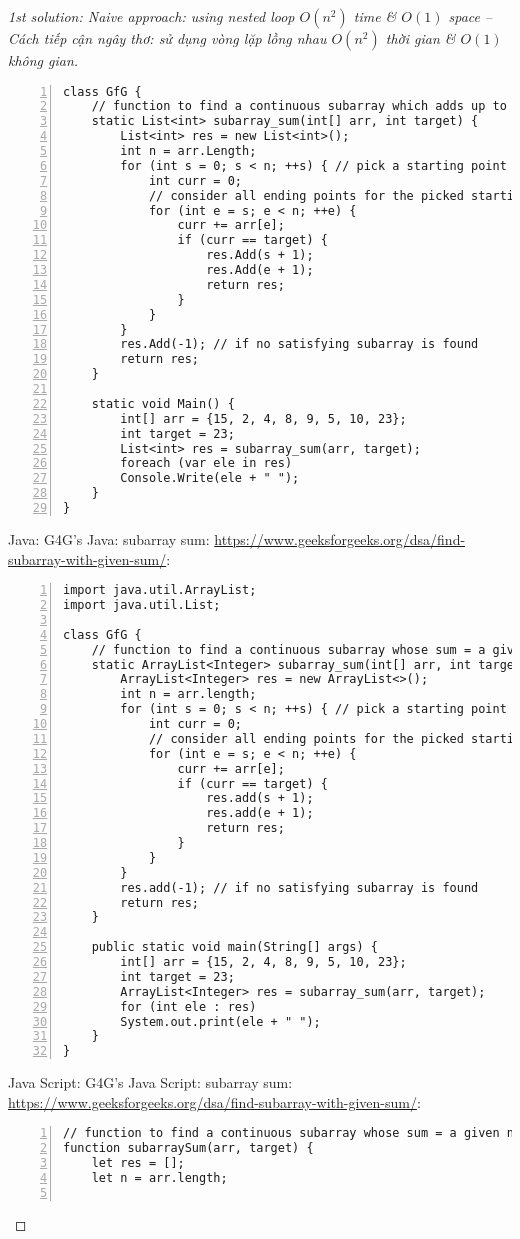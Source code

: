 \documentclass{article}
\begin{document}
\begin{proof}[1st solution: Naive approach: using nested loop $O(n^2)$ time \& $O(1)$ space -- Cách tiếp cận ngây thơ: sử dụng vòng lặp lồng nhau $O(n^2)$ thời gian \& $O(1)$ không gian]
\begin{Verbatim}[numbers=left,xleftmargin=5mm]
class GfG {
    // function to find a continuous subarray which adds up to a given number
    static List<int> subarray_sum(int[] arr, int target) {
        List<int> res = new List<int>();
        int n = arr.Length;
        for (int s = 0; s < n; ++s) { // pick a starting point for a subarray
            int curr = 0;
            // consider all ending points for the picked starting point
            for (int e = s; e < n; ++e) {
                curr += arr[e];
                if (curr == target) {
                    res.Add(s + 1);
                    res.Add(e + 1);
                    return res;
                }
            }
        }
        res.Add(-1); // if no satisfying subarray is found
        return res;
    }

    static void Main() {
        int[] arr = {15, 2, 4, 8, 9, 5, 10, 23};
        int target = 23;
        List<int> res = subarray_sum(arr, target);
        foreach (var ele in res)
        Console.Write(ele + " ");
    }
}
    \end{Verbatim}
    Java: G4G's Java: subarray sum: \url{https://www.geeksforgeeks.org/dsa/find-subarray-with-given-sum/}:
    \begin{Verbatim}[numbers=left,xleftmargin=5mm]
import java.util.ArrayList;
import java.util.List;

class GfG {
    // function to find a continuous subarray whose sum = a given number
    static ArrayList<Integer> subarray_sum(int[] arr, int target) {
        ArrayList<Integer> res = new ArrayList<>();
        int n = arr.length;
        for (int s = 0; s < n; ++s) { // pick a starting point for a subarray
            int curr = 0;
            // consider all ending points for the picked starting point
            for (int e = s; e < n; ++e) {
                curr += arr[e];
                if (curr == target) {
                    res.add(s + 1);
                    res.add(e + 1);
                    return res;
                }
            }
        }
        res.add(-1); // if no satisfying subarray is found
        return res;
    }

    public static void main(String[] args) {
        int[] arr = {15, 2, 4, 8, 9, 5, 10, 23};
        int target = 23;
        ArrayList<Integer> res = subarray_sum(arr, target);
        for (int ele : res)
        System.out.print(ele + " ");
    }
}
    \end{Verbatim}
    Java Script: G4G's Java Script: subarray sum: \url{https://www.geeksforgeeks.org/dsa/find-subarray-with-given-sum/}:
    \begin{Verbatim}[numbers=left,xleftmargin=5mm]
// function to find a continuous subarray whose sum = a given number
function subarraySum(arr, target) {
    let res = [];
    let n = arr.length;


\end{Verbatim}
\end{proof}
\end{document}
